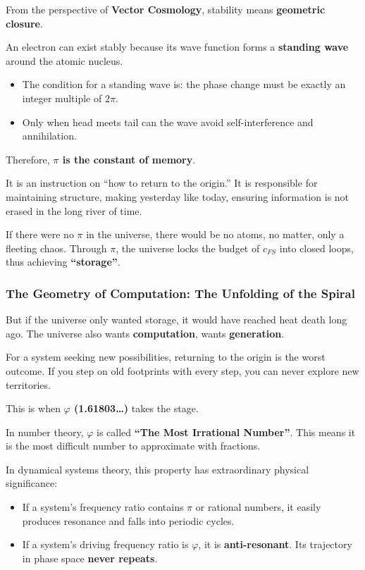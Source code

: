 From the perspective of \textbf{Vector Cosmology}, stability means \textbf{geometric closure}.

An electron can exist stably because its wave function forms a \textbf{standing wave} around the atomic nucleus.

\begin{itemize}
\item The condition for a standing wave is: the phase change must be exactly an integer multiple of $2\pi$.

\item Only when head meets tail can the wave avoid self-interference and annihilation.
\end{itemize}

Therefore, \textbf{$\pi$ is the constant of memory}.

It is an instruction on ``how to return to the origin.'' It is responsible for maintaining structure, making yesterday like today, ensuring information is not erased in the long river of time.

If there were no $\pi$ in the universe, there would be no atoms, no matter, only a fleeting chaos. Through $\pi$, the universe locks the budget of $c_{FS}$ into closed loops, thus achieving \textbf{``storage''}.

\subsubsection{The Geometry of Computation: The Unfolding of the Spiral}

But if the universe only wanted storage, it would have reached heat death long ago. The universe also wants \textbf{computation}, wants \textbf{generation}.

For a system seeking new possibilities, returning to the origin is the worst outcome. If you step on old footprints with every step, you can never explore new territories.

This is when \textbf{$\varphi$ (1.61803\ldots)} takes the stage.

In number theory, $\varphi$ is called \textbf{``The Most Irrational Number''}. This means it is the most difficult number to approximate with fractions.

In dynamical systems theory, this property has extraordinary physical significance:

\begin{itemize}
\item If a system's frequency ratio contains $\pi$ or rational numbers, it easily produces resonance and falls into periodic cycles.

\item If a system's driving frequency ratio is $\varphi$, it is \textbf{anti-resonant}. Its trajectory in phase space \textbf{never repeats}.
\end{itemize}

